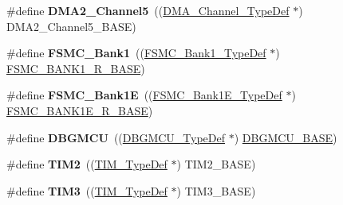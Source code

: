 \begin{DoxyCompactItemize}
\item 
\hypertarget{group___peripheral__declaration_ga521c13b7d0f82a6897d47995da392750}{\#define {\bfseries D\-M\-A2\-\_\-\-Channel5}~((\hyperlink{struct_d_m_a___channel___type_def}{D\-M\-A\-\_\-\-Channel\-\_\-\-Type\-Def} $\ast$) D\-M\-A2\-\_\-\-Channel5\-\_\-\-B\-A\-S\-E)}\label{group___peripheral__declaration_ga521c13b7d0f82a6897d47995da392750}

\item 
\hypertarget{group___peripheral__declaration_ga2a759bad07fe730c99f9e1490e646220}{\#define {\bfseries F\-S\-M\-C\-\_\-\-Bank1}~((\hyperlink{struct_f_s_m_c___bank1___type_def}{F\-S\-M\-C\-\_\-\-Bank1\-\_\-\-Type\-Def} $\ast$) \hyperlink{group___peripheral__memory__map_ga48d8f80d608b64cb42e7ed223066f856}{F\-S\-M\-C\-\_\-\-B\-A\-N\-K1\-\_\-\-R\-\_\-\-B\-A\-S\-E})}\label{group___peripheral__declaration_ga2a759bad07fe730c99f9e1490e646220}

\item 
\hypertarget{group___peripheral__declaration_ga422986101f42a8811ae89ac69deb2759}{\#define {\bfseries F\-S\-M\-C\-\_\-\-Bank1\-E}~((\hyperlink{struct_f_s_m_c___bank1_e___type_def}{F\-S\-M\-C\-\_\-\-Bank1\-E\-\_\-\-Type\-Def} $\ast$) \hyperlink{group___peripheral__memory__map_gaa2ebab683a214fe3b0c628228bff3724}{F\-S\-M\-C\-\_\-\-B\-A\-N\-K1\-E\-\_\-\-R\-\_\-\-B\-A\-S\-E})}\label{group___peripheral__declaration_ga422986101f42a8811ae89ac69deb2759}

\item 
\hypertarget{group___peripheral__declaration_ga92ec6d9ec2251fda7d4ce09748cd74b4}{\#define {\bfseries D\-B\-G\-M\-C\-U}~((\hyperlink{struct_d_b_g_m_c_u___type_def}{D\-B\-G\-M\-C\-U\-\_\-\-Type\-Def} $\ast$) \hyperlink{group___peripheral__memory__map_ga4adaf4fd82ccc3a538f1f27a70cdbbef}{D\-B\-G\-M\-C\-U\-\_\-\-B\-A\-S\-E})}\label{group___peripheral__declaration_ga92ec6d9ec2251fda7d4ce09748cd74b4}

\item 
\hypertarget{group___peripheral__declaration_ga3cfac9f2e43673f790f8668d48b4b92b}{\#define {\bfseries T\-I\-M2}~((\hyperlink{struct_t_i_m___type_def}{T\-I\-M\-\_\-\-Type\-Def} $\ast$) T\-I\-M2\-\_\-\-B\-A\-S\-E)}\label{group___peripheral__declaration_ga3cfac9f2e43673f790f8668d48b4b92b}

\item 
\hypertarget{group___peripheral__declaration_ga61ee4c391385607d7af432b63905fcc9}{\#define {\bfseries T\-I\-M3}~((\hyperlink{struct_t_i_m___type_def}{T\-I\-M\-\_\-\-Type\-Def} $\ast$) T\-I\-M3\-\_\-\-B\-A\-S\-E)}\label{group___peripheral__declaration_ga61ee4c391385607d7af432b63905fcc9}


\end{DoxyCompactItemize}
